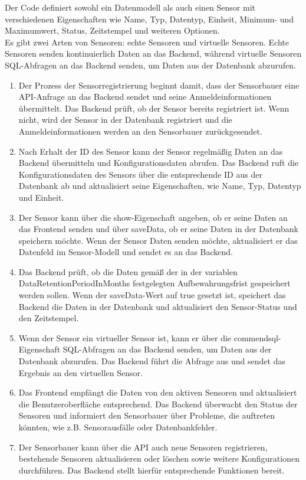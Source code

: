 \begin{flushleft}
	Der Code definiert sowohl ein Datenmodell als auch einen Sensor mit verschiedenen Eigenschaften wie Name, Typ, Datentyp, Einheit, Minimum- und Maximumwert, Status, Zeitstempel und weiteren Optionen.\\
	Es gibt zwei Arten von Sensoren: echte Sensoren und virtuelle Sensoren. Echte Sensoren senden kontinuierlich Daten an das Backend, während virtuelle Sensoren SQL-Abfragen an das Backend senden, um Daten aus der Datenbank abzurufen.
	\\
	\begin{enumerate}
		\item Der Prozess der Sensorregistrierung beginnt damit, dass der Sensorbauer eine API-Anfrage an das Backend sendet und seine Anmeldeinformationen übermittelt. Das Backend prüft, ob der Sensor bereits registriert ist. Wenn nicht, wird der Sensor in der Datenbank registriert und die Anmeldeinformationen werden an den Sensorbauer zurückgesendet.
		\item Nach Erhalt der ID des Sensor kann der Sensor regelmäßig Daten an das Backend übermitteln und Konfigurationsdaten abrufen. Das Backend ruft die Konfigurationsdaten des Sensors über die entsprechende ID aus der Datenbank ab und aktualisiert seine Eigenschaften, wie Name, Typ, Datentyp und Einheit.
		\item Der Sensor kann über die show-Eigenschaft angeben, ob er seine Daten an das Frontend senden und über saveData, ob er seine Daten in der Datenbank speichern möchte. Wenn der Sensor Daten senden möchte, aktualisiert er das Datenfeld im Sensor-Modell und sendet es an das Backend.
		\item Das Backend prüft, ob die Daten gemäß der in der variablen DataRetentionPeriodInMonths festgelegten Aufbewahrungsfrist gespeichert werden sollen. Wenn der saveData-Wert auf true gesetzt ist, speichert das Backend die Daten in der Datenbank und aktualisiert den Sensor-Status und den Zeitstempel.
		\item Wenn der Sensor ein virtueller Sensor ist, kann er über die commendsql-Eigenschaft SQL-Abfragen an das Backend senden, um Daten aus der Datenbank abzurufen. Das Backend führt die Abfrage aus und sendet das Ergebnis an den virtuellen Sensor.
		\item Das Frontend empfängt die Daten von den aktiven Sensoren und aktualisiert die Benutzeroberfläche entsprechend. Das Backend überwacht den Status der Sensoren und informiert den Sensorbauer über Probleme, die auftreten könnten, wie z.B. Sensorausfälle oder Datenbankfehler.
		\item Der Sensorbauer kann über die API auch neue Sensoren registrieren, bestehende Sensoren aktualisieren oder löschen sowie weitere Konfigurationen durchführen. Das Backend stellt hierfür entsprechende Funktionen bereit.
	\end{enumerate}




\end{flushleft}
